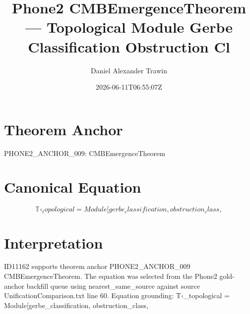 \documentclass[11pt]{article}
\title{Phone2 CMBEmergenceTheorem — Topological Module Gerbe Classification Obstruction Cl}
\author{Daniel Alexander Trawin}
\date{2026-06-11T06:55:07Z}
\begin{document}
\maketitle
\section*{Theorem Anchor}
PHONE2_ANCHOR_009: CMBEmergenceTheorem
\section*{Canonical Equation}
\[
𝕋‹_topological = Module[{gerbe_classification, obstruction_class},
\]
\section*{Interpretation}
ID11162 supports theorem anchor PHONE2_ANCHOR_009 CMBEmergenceTheorem. The equation was selected from the Phone2 gold-anchor backfill queue using nearest_same_source against source UnificationComparison.txt line 60. Equation grounding: 𝕋‹_topological = Module[{gerbe_classification, obstruction_class},
\end{document}
